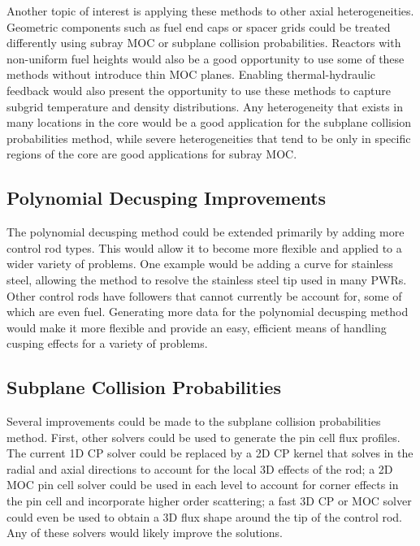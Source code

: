 Another topic of interest is applying these methods to other axial heterogeneities.  Geometric components such as fuel end caps or spacer grids could be treated differently using subray MOC or subplane collision probabilities.  Reactors with non-uniform fuel heights would also be a good opportunity to use some of these methods without introduce thin MOC planes.  Enabling thermal-hydraulic feedback would also present the opportunity to use these methods to capture subgrid temperature and density distributions.  Any heterogeneity that exists in many locations in the core would be a good application for the subplane collision probabilities method, while severe heterogeneities that tend to be only in specific regions of the core are good applications for subray MOC.

\subsection{Polynomial Decusping Improvements}

The polynomial decusping method could be extended primarily by adding more control rod types.  This would allow it to become more flexible and applied to a wider variety of problems.  One example would be adding a curve for stainless steel, allowing the method to resolve the stainless steel tip used in many PWRs.  Other control rods have followers that cannot currently be account for, some of which are even fuel.  Generating more data for the polynomial decusping method would make it more flexible and provide an easy, efficient means of handling cusping effects for a variety of problems.


\subsection{Subplane Collision Probabilities}

Several improvements could be made to the subplane collision probabilities method.  First, other solvers could be used to generate the pin cell flux profiles.  The current 1D CP solver could be replaced by a 2D CP kernel that solves in the radial and axial directions to account for the local 3D effects of the rod; a 2D MOC pin cell solver could be used in each level to account for corner effects in the pin cell and incorporate higher order scattering; a fast 3D CP or MOC solver could even be used to obtain a 3D flux shape around the tip of the control rod.  Any of these solvers would likely improve the solutions.

